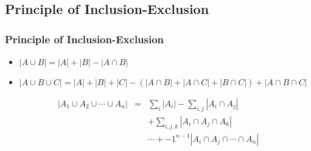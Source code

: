 \documentclass[dvipsnames]{beamer}
\begin{document}
\subsection{Principle of Inclusion-Exclusion}

\begin{frame}
  \frametitle{Principle of Inclusion-Exclusion}

  \begin{itemize}
    \item $|A \cup B| = |A| + |B| - |A \cap B|$

    \pause
    \item $|A \cup B \cup C| = |A| + |B| + |C|
      - (|A \cap B| + |A \cap C| + |B \cap C|)
      + |A \cap B \cap C|$
  \end{itemize}

  \pause
  \begin{theorem}
    \begin{eqnarray*}
      |A_1 \cup A_2 \cup \cdots \cup A_n| & = & \sum_i{|A_i|}
          - \sum_{i,j}{|A_i \cap A_j|}\\
      & & + \sum_{i,j,k}{|A_i \cap A_j \cap A_k|}\\
      & & \cdots + -1^{n-1} {|A_i \cap A_j \cap \cdots \cap A_n|}
    \end{eqnarray*}
  \end{theorem}
\end{frame}
\end{document}
